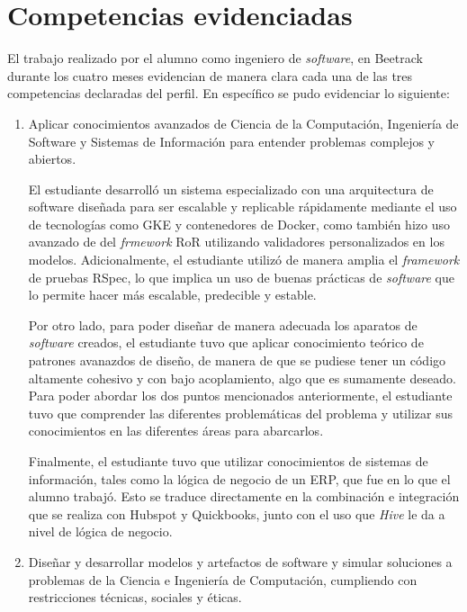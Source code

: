 \section{Competencias evidenciadas}

  El trabajo realizado por el alumno como ingeniero de \textit{software}, en Beetrack durante los cuatro meses evidencian de manera clara cada una de las tres competencias declaradas del perfil. En específico se pudo evidenciar lo siguiente:

  \begin{enumerate}
    \item Aplicar conocimientos avanzados de Ciencia de la Computación, Ingeniería de Software y Sistemas de Información para entender problemas complejos y abiertos.
    
    El estudiante desarrolló un sistema especializado con una arquitectura de software diseñada para ser escalable y replicable rápidamente mediante el uso de tecnologías como GKE y contenedores de Docker, como también hizo uso avanzado de del \textit{frmework} RoR utilizando validadores personalizados en los modelos. Adicionalmente, el estudiante utilizó de manera amplia el \textit{framework} de pruebas RSpec, lo que implica un uso de buenas prácticas de \textit{software} que lo permite hacer más escalable, predecible y estable.

    Por otro lado, para poder diseñar de manera adecuada los aparatos de \textit{software} creados, el estudiante tuvo que aplicar conocimiento teórico de patrones avanazdos de diseño, de manera de que se pudiese tener un código altamente cohesivo y con bajo acoplamiento, algo que es sumamente deseado. Para poder abordar los dos puntos mencionados anteriormente, el estudiante tuvo que comprender las diferentes problemáticas del problema y utilizar sus conocimientos en las diferentes áreas para abarcarlos.

    Finalmente, el estudiante tuvo que utilizar conocimientos de sistemas de información, tales como la lógica de negocio de un ERP, que fue en lo que el alumno trabajó. Esto se traduce directamente en la combinación e integración que se realiza con Hubspot y Quickbooks, junto con el uso que \textit{Hive} le da a nivel de lógica de negocio.

    \item Diseñar y desarrollar modelos y artefactos de software y simular soluciones a problemas de la Ciencia e Ingeniería de Computación, cumpliendo con restricciones técnicas, sociales y éticas.
    

\end{enumerate}

